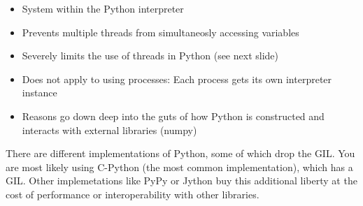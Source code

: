 \begin{frame}
%
\begin{defbox}
\small
\begin{itemize}
\item System within the Python interpreter
\item Prevents multiple threads from simultaneosly accessing variables
\item[\Thus] Severely limits the use of threads in Python (see next slide)
\item[\Thus] Does not apply to using processes: Each process gets its own interpreter instance
\item[\Thus] Reasons go down deep into the guts of how Python is constructed and interacts with external libraries (\zB numpy)
\end{itemize}
\end{defbox}
%
\begin{hintbox}
\footnotesize
There are different implementations of Python, some of which drop the GIL. You are most likely using C-Python (the most common implementation), which has a GIL. Other implemetations like PyPy or Jython buy this additional liberty at the cost of performance or interoperability with other libraries.
\end{hintbox}
%
\end{frame}


